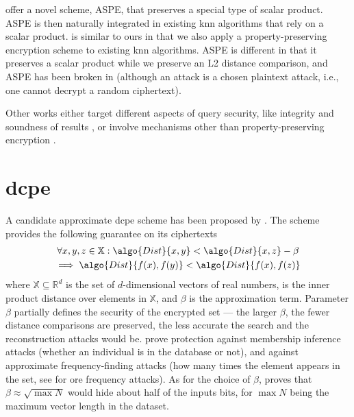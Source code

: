 		\textcite{knn-aspe} offer a novel scheme, ASPE, that preserves a special type of scalar product.
		ASPE is then naturally integrated in existing \acrshort{knn} algorithms that rely on a scalar product.
		\cite{knn-aspe} is similar to ours in that we also apply a property-preserving encryption scheme to existing \acrshort{knn} algorithms.
		ASPE is different in that it preserves a scalar product while we preserve an L2 distance comparison, and ASPE has been broken in \cite{secure-nn-revisited-break-aspe} (although an attack is a chosen plaintext attack, i.e., one cannot decrypt a random ciphertext).

		Other works either target different aspects of query security, like integrity and soundness of results \cite{knn-integrity-soundness,svknn}, or involve mechanisms other than property-preserving encryption \cite{seceqp,practical-approx-knn,knn-sharing-keys,knn-mult-data-owners,knn-over-encrypted,knn-paillier,knn-blind,knn-homomorphism,knn-strong-location-privacy,knn-no-anonymizers,knn-efficient,knn-new-casper}.

	\section{\texorpdfstring{\acrlong{dcpe}}{Distance Comparison Preserving Encryption}}

		A candidate approximate \acrshort{dcpe} scheme has been proposed by \textcite{dcpe}.
		The scheme provides the following guarantee on its ciphertexts
		\begin{multline*}
			\forall x, y, z \in \mathbb{X} : \algo{Dist}{x, y} < \algo{Dist}{x, z} - \beta \\
			\implies \algo{Dist}{f(x), f(y)} < \algo{Dist}{f(x), f(z)}
		\end{multline*}
		where $\mathbb{X} \subseteq \mathbb{R}^d$ is the set of $d$-dimensional vectors of real numbers,  is the inner product distance over elements in $\mathbb{X}$, and $\beta$ is the approximation term.
		Parameter $\beta$ partially defines the security of the encrypted set --- the larger $\beta$, the fewer distance comparisons are preserved, the less accurate the search and the reconstruction attacks would be.
		\textcite{dcpe} prove protection against membership inference attacks \cite{memebership-inference-attacks-knn} (whether an individual is in the database or not), and against approximate frequency-finding attacks (how many times the element appears in the set, see \cite{leakage-abuse-grubs-2017} for \acrshort{ore} frequency attacks).
		As for the choice of $\beta$, \cite{dcpe} proves that $\beta \approx \sqrt{\max N}$ would hide about half of the inputs bits, for $\max N$ being the maximum vector length in the dataset.


